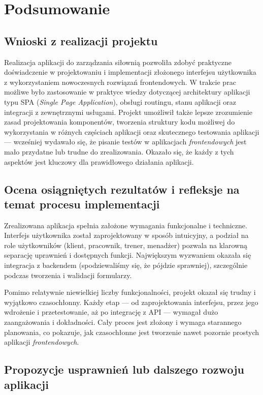 \documentclass[../../spr.tex]{subfiles}
\begin{document}
\section{Podsumowanie}

\subsection{Wnioski z realizacji projektu}

Realizacja aplikacji do zarządzania siłownią pozwoliła zdobyć praktyczne doświadczenie w projektowaniu i implementacji złożonego interfejsu użytkownika z wykorzystaniem nowoczesnych rozwiązań frontendowych. W trakcie prac możliwe było zastosowanie w praktyce wiedzy dotyczącej architektury aplikacji typu SPA (\textit{Single Page Application}), obsługi routingu, stanu aplikacji oraz integracji z zewnętrznymi usługami. Projekt umożliwił także lepsze zrozumienie zasad projektowania komponentów, tworzenia struktury kodu możliwej do wykorzystania w różnych częściach aplikacji oraz skutecznego testowania aplikacji — wcześniej wydawało się, że pisanie testów w aplikacjach \textit{frontendowych} jest mało przydatne lub trudne do zrealizowania. Okazało się, że każdy z tych aspektów jest kluczowy dla prawidłowego działania aplikacji.

\subsection{Ocena osiągniętych rezultatów i refleksje na temat procesu implementacji}

Zrealizowana aplikacja spełnia założone wymagania funkcjonalne i techniczne. Interfejs użytkownika został zaprojektowany w sposób intuicyjny, a podział na role użytkowników (klient, pracownik, trener, menadżer) pozwala na klarowną separację uprawnień i dostępnych funkcji. Największym wyzwaniem okazała się integracja z backendem (spodziewaliśmy się, że pójdzie sprawniej), szczególnie podczas tworzenia i walidacji formularzy.

Pomimo relatywnie niewielkiej liczby funkcjonalności, projekt okazał się trudny i wyjątkowo czasochłonny. Każdy etap — od zaprojektowania interfejsu, przez jego wdrożenie i przetestowanie, aż po integrację z API — wymagał dużo zaangażowania i dokładności. Cały proces jest złożony i wymaga starannego planowania, co pokazuje, jak czasochłonne jest tworzenie nawet pozornie prostych aplikacji \textit{frontendowych}.

\subsection{Propozycje usprawnień lub dalszego rozwoju aplikacji}
\end{document}
